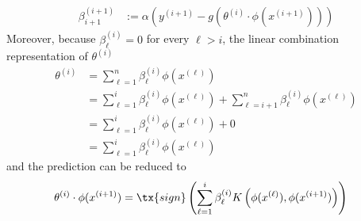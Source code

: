 \documentclass[11pt]{article}
\newcommand{\upi}[0]{^{(i)}}
\begin{document}
	\begin{align}
		\beta_{i+1}^{(i+1)} &:= \alpha \left(y^{(i+1)} - g(\theta\upi \cdot \phi(x^{(i+1)}) )\right)
	\end{align}
	Moreover, because $\beta_\ell\upi = 0$ for every  $\ell > i$, the linear combination representation of $\theta\upi$ 
	\begin{align}
		\theta\upi &= \sum_{\ell=1}^n \beta_\ell\upi \phi(x^{(\ell)}) \\
		&= \sum_{\ell=1}^i \beta_\ell\upi \phi(x^{(\ell)}) + \sum_{\ell=i+1}^n \beta_\ell\upi \phi(x^{(\ell)}) \\
		&= \sum_{\ell=1}^i \beta_\ell\upi \phi(x^{(\ell)}) + 0 \\
		&= \sum_{\ell=1}^i \beta_\ell\upi \phi(x^{(\ell)})
	\end{align}
	and the prediction can be reduced to
	\begin{align}
		\theta\upi \cdot \phi(x^{(i+1)}) &= \tx{sign}\left(
		\sum_{\ell=1}^i \beta_\ell\upi K \left(\phi(x^{(\ell)}),\phi(x^{(i+1)}) \right)
		\right)
	\end{align}
\end{document}
